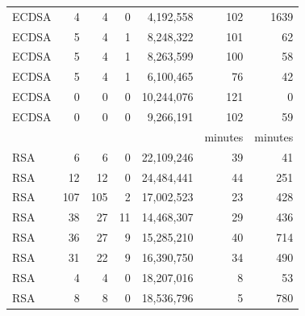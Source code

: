 \begin{table}[h]
\begin{threeparttable}
\begin{tabular}{l@{}r@{~~}rrr@{~~}rr}
        ECDSA\tnote{3}              &   4                   &   4                 & 0                    &  4,192,558    & 102   & 1639          \\   
        ECDSA\tnote{4}              &  5                    & 4                   & 1                    &  8,248,322       & 101     & 62           \\   
        ECDSA\tnote{5}              &  5                    & 4                   & 1                    &  8,263,599      & 100     & 58            \\   
        ECDSA\tnote{6}              &  5                    & 4                   & 1                    &  6,100,465       & 76      & 42                  \\  
        ECDSA\tnote{7}              & 0                      &  0                   &    0               &  10,244,076       &  121     & 0                  \\  
        ECDSA\tnote{8}              & 0                      &  0                   &  0                 &  9,266,191          & 102     & 59        \\  


                           &                        &                     &                      &                 & minutes   & minutes         \\\cline{6-7}
        RSA\tnote{1}                & 6                       & 6                   & 0                    & 22,109,246    & 39     & 41           \\
        RSA\tnote{2}                & 12                      & 12                  & 0                    & 24,484,441    & 44     & 251           \\
        RSA\tnote{4}                & 107                    & 105                 & 2                    & 17,002,523   & 23      & 428           \\
        RSA\tnote{5}                & 38                     & 27                  & 11                   & 14,468,307   & 29     & 436          \\
        RSA\tnote{6}                & 36                     & 27                  & 9                    & 15,285,210   & 40     & 714          \\
        RSA\tnote{7}                & 31                     & 22                  & 9                    & 16,390,750   & 34      & 490         \\
        RSA\tnote{8}                & 4                      &  4                  & 0                    & 18,207,016   & 8      & 53          \\
        RSA\tnote{9}                & 8                      &  8                  & 0                    & 18,536,796    & 5      & 780         \\



\end{tabular}
\end{threeparttable}
\end{table}
